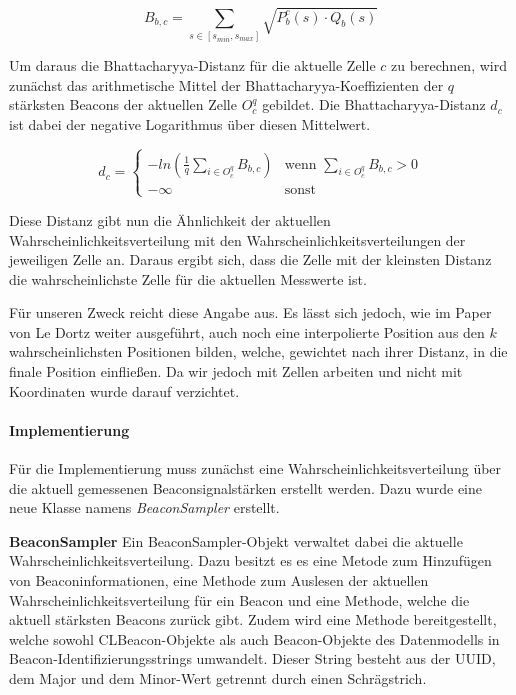 \begin{equation}
	B_{b, c} = \sum_{s \in [s_{min},s_{max}]} \sqrt{P_{b}^{c}(s) \cdot Q_{b}(s)}
\end{equation}

Um daraus die Bhattacharyya-Distanz für die aktuelle Zelle $c$ zu berechnen, wird zunächst das arithmetische Mittel der Bhattacharyya-Koeffizienten der $q$ stärksten Beacons der aktuellen Zelle $O_{c}^{q}$ gebildet. Die Bhattacharyya-Distanz $d_{c}$ ist dabei der negative Logarithmus über diesen Mittelwert.

\begin{equation}
	d_{c}= \begin{cases}
	-ln (\frac{1}{q} \sum_{i \in O_{c}^{q}} B_{b, c}) & \text{wenn } \sum_{i \in O_{c}^{q}} B_{b, c} > 0 \\
	- \infty & \text{sonst}
	\end{cases}
\end{equation}

Diese Distanz gibt nun die Ähnlichkeit der aktuellen Wahrscheinlichkeitsverteilung mit den Wahrscheinlichkeitsverteilungen der jeweiligen Zelle an. Daraus ergibt sich, dass die Zelle mit der kleinsten Distanz die wahrscheinlichste Zelle für die aktuellen Messwerte ist.

Für unseren Zweck reicht diese Angabe aus. Es lässt sich jedoch, wie im Paper von Le Dortz \cite{wifiFingerprintProbability} weiter ausgeführt, auch noch eine interpolierte Position aus den $k$ wahrscheinlichsten Positionen bilden, welche, gewichtet nach ihrer Distanz, in die finale Position einfließen. Da wir jedoch mit Zellen arbeiten und nicht mit Koordinaten wurde darauf verzichtet. 

\paragraph{Implementierung}
\label{sec:implementation:fingerprinting:positioning:probability:implementiation}
Für die Implementierung muss zunächst eine Wahrscheinlichkeitsverteilung über die aktuell gemessenen Beaconsignalstärken erstellt werden. Dazu wurde eine neue Klasse namens \emph{BeaconSampler} erstellt. 


\textbf{BeaconSampler}
Ein BeaconSampler-Objekt verwaltet dabei die aktuelle Wahrscheinlichkeitsverteilung. Dazu besitzt es es eine Metode zum Hinzufügen von Beaconinformationen, eine Methode zum Auslesen der aktuellen Wahrscheinlichkeitsverteilung für ein Beacon und eine Methode, welche die aktuell stärksten Beacons zurück gibt. Zudem wird eine Methode bereitgestellt, welche sowohl CLBeacon-Objekte als auch Beacon-Objekte des Datenmodells in Beacon-Identifizierungsstrings umwandelt. Dieser String besteht aus der UUID, dem Major und dem Minor-Wert getrennt durch einen Schrägstrich.

